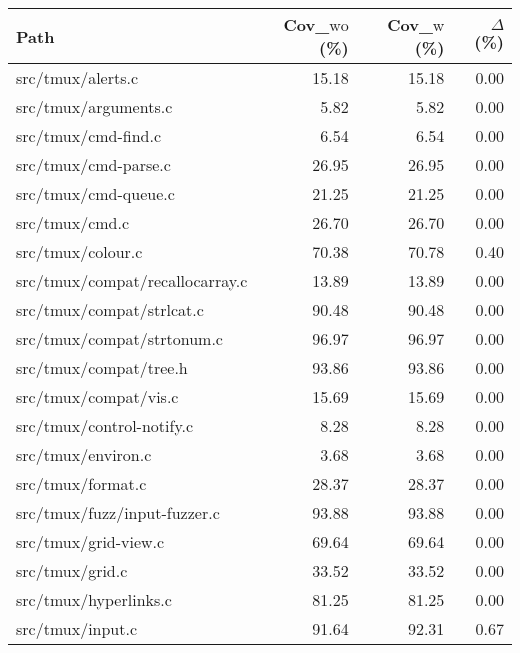 \begin{table*}[!tb]  %
	\centering
	\scriptsize
	\setlength{\tabcolsep}{4pt}    %
	\renewcommand{\arraystretch}{1.1}

	\begin{tabular}{@{}lrrr@{}}     %
		\toprule
		Path                                &
		Cov\_$\text{wo}$ (\%)               &
		Cov\_$\text{w}$ (\%)                &
		$\Delta$ (\%)                                              \\
		\midrule
		src/tmux/alerts.c                   & 15.18 & 15.18 & 0.00 \\
		src/tmux/arguments.c                & 5.82  & 5.82  & 0.00 \\
		src/tmux/cmd-find.c                 & 6.54  & 6.54  & 0.00 \\
		src/tmux/cmd-parse.c                & 26.95 & 26.95 & 0.00 \\
		src/tmux/cmd-queue.c                & 21.25 & 21.25 & 0.00 \\
		src/tmux/cmd.c                      & 26.70 & 26.70 & 0.00 \\
		\rowcolor{yellow} src/tmux/colour.c & 70.38 & 70.78 & 0.40 \\
		src/tmux/compat/recallocarray.c     & 13.89 & 13.89 & 0.00 \\
		src/tmux/compat/strlcat.c           & 90.48 & 90.48 & 0.00 \\
		src/tmux/compat/strtonum.c          & 96.97 & 96.97 & 0.00 \\
		src/tmux/compat/tree.h              & 93.86 & 93.86 & 0.00 \\
		src/tmux/compat/vis.c               & 15.69 & 15.69 & 0.00 \\
		src/tmux/control-notify.c           & 8.28  & 8.28  & 0.00 \\
		src/tmux/environ.c                  & 3.68  & 3.68  & 0.00 \\
		src/tmux/format.c                   & 28.37 & 28.37 & 0.00 \\
		src/tmux/fuzz/input-fuzzer.c        & 93.88 & 93.88 & 0.00 \\
		src/tmux/grid-view.c                & 69.64 & 69.64 & 0.00 \\
		src/tmux/grid.c                     & 33.52 & 33.52 & 0.00 \\
		src/tmux/hyperlinks.c               & 81.25 & 81.25 & 0.00 \\
		\rowcolor{yellow} src/tmux/input.c  & 91.64 & 92.31 & 0.67 \\

\end{tabular}
\end{table*}
